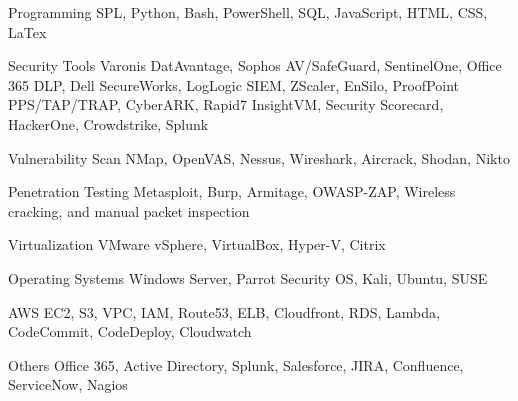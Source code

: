 
\begin{cvskills}
  \cvskill
    {Programming} %
    {SPL, Python, Bash, PowerShell, SQL, JavaScript, HTML, CSS, LaTex} %

  \cvskill
    {Security Tools} %
    {Varonis DatAvantage, Sophos AV/SafeGuard, SentinelOne, Office 365 DLP, Dell SecureWorks, LogLogic SIEM, ZScaler, \newline
      EnSilo, ProofPoint PPS/TAP/TRAP, CyberARK, Rapid7 InsightVM, Security Scorecard, HackerOne, Crowdstrike, Splunk} %

  \cvskill
     {Vulnerability Scan} %
     {NMap, OpenVAS, Nessus, Wireshark, Aircrack, Shodan, Nikto} %
 
  \cvskill
     {Penetration Testing} %
     {Metasploit, Burp, Armitage, OWASP-ZAP, Wireless cracking, and manual packet inspection} %
 
  \cvskill
    {Virtualization} %
    {VMware vSphere, VirtualBox, Hyper-V, Citrix} %

  \cvskill
    {Operating Systems} %
    {Windows Server, Parrot Security OS, Kali, Ubuntu, SUSE} %

  \cvskill
    {AWS} %
    {EC2, S3, VPC, IAM, Route53, ELB, Cloudfront, RDS, Lambda, CodeCommit, CodeDeploy, Cloudwatch} %

  \cvskill
    {Others} %
    {Office 365, Active Directory, Splunk, Salesforce, JIRA, Confluence, ServiceNow, Nagios} %

\end{cvskills}
